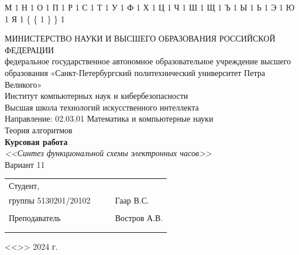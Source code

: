 \documentclass[a4paper, final]{article}
\begin{document}
{  {М}{ {\selectfont{}} }1
  {Н}{ {\selectfont{}} }1
  {О}{ {\selectfont{}} }1
  {П}{ {\selectfont{}} }1
  {Р}{ {\selectfont{}} }1
  {С}{ {\selectfont{}} }1
  {Т}{ {\selectfont{}} }1
  {У}{ {\selectfont{}} }1
  {Ф}{ {\selectfont{}} }1
  {Х}{ {\selectfont{}} }1
  {Ц}{ {\selectfont{}} }1
  {Ч}{ {\selectfont{}} }1
  {Ш}{ {\selectfont{}} }1
  {Щ}{ {\selectfont{}} }1
  {Ъ}{ {\selectfont{}} }1
  {Ы}{ {\selectfont{}} }1
  {Ь}{ {\selectfont{}} }1
  {Э}{ {\selectfont{}} }1
  {Ю}{ {\selectfont{}} }1
  {Я}{ {\selectfont{}} }1
  {\{}{ { {\color{brackets}\{} } }1 %
  {\} }{ { {\color{brackets}\} } } }1 %
}

\begin{center}
\hfill \break
\hfill \break
\normalsize{МИНИСТЕРСТВО НАУКИ И ВЫСШЕГО ОБРАЗОВАНИЯ РОССИЙСКОЙ ФЕДЕРАЦИИ\\
 федеральное государственное автономное образовательное учреждение высшего образования «Санкт-Петербургский политехнический университет Петра Великого»\\[5pt]}
\normalsize{Институт компьютерных наук и кибербезопасности}\\[5pt] 
\normalsize{Высшая школа технологий искусственного интеллекта}\\[5pt] 
\normalsize{Направление: 02.03.01 Математика и компьютерные науки}\\

\hfill \break
\hfill \break
\hfill \break
\large{Теория алгоритмов}\\
\hfill \break
\large{\textbf{Курсовая работа}}\\
\large{\textit{<<Синтез функциональной схемы электронных часов>>\\}}
\large{Вариант 11\\}

\hfill \break
\hfill \break
\end{center}
 
\small{ 
\begin{tabular}{lrrl}
\!\!\!Студент, & \hspace{2cm} & & \\
\!\!\!группы 5130201/20102 & \hspace{2cm} & \underline{\hspace{3cm}} &Гаар В.С. \\\\
\!\!\!Преподаватель & \hspace{2cm} & \underline{\hspace{3cm}} &  Востров А.В. \\\\
&&\hspace{5cm}
\end{tabular}
\begin{flushright}
\hfill \break
<<\underline{\hspace{1cm}}>>\underline{\hspace{2.5cm}} 2024 г.
\end{flushright}
}
\end{document}
